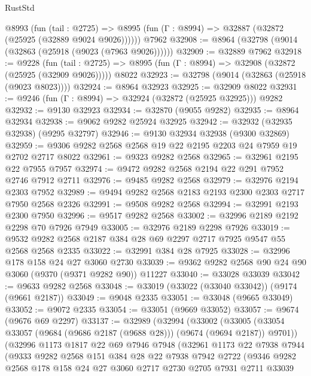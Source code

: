 \begin{lexlean}{RustStd}
\begin{coremodule}
    @8993
      (fun (tail : @2725) =>
      @8995 (fun (Γ : @8994) => @32887 (@32872 (@25925 (@32889 @9024 @9026))))))
    @7962
@32908 := @8964 (@32798 (@9014 (@32863 (@25918 (@9023 (@7963 @9026))))))
@32909 := @32889 @7962
@32918 := @9228
    (fun (tail : @2725) => @8995 (fun (Γ : @8994) => @32908 (@32872 (@25925 (@32909 @9026)))))
    @8022
@32923 := @32798 (@9014 (@32863 (@25918 (@9023 @8023))))
@32924 := @8964 @32923
@32925 := @32909 @8022
@32931 := @9246 (fun (Γ : @8994) => @32924 (@32872 (@25925 @32925))) @9282
@32932 := @9130 @32923
@32934 := @32870 (@9055 @9282)
@32935 := @8964 @32934
@32938 := @9062 @9282 @25924 @32925
@32942 := @32932 (@32935 @32938) (@9295 @32797)
@32946 := @9130 @32934 @32938 (@9300 @32869)
@32959 := @9306 @9282 @2568 @2568 @19 @22 @2195 @2203 @24 @7959 @19 @2702 @2717 @8022
@32961 := @9323 @9282 @2568
@32965 := @32961 @2195 @22 @7955 @7957
@32974 := @9472 @9282 @2568 @2194 @22 @291 @7952 @2746 @7912 @2711
@32976 := @9485 @9282 @2568
@32979 := @32976 @2194 @2303 @7952
@32989 := @9494 @9282 @2568 @2183 @2193 @2300 @2303 @2717 @7950 @2568 @2326
@32991 := @9508 @9282 @2568
@32994 := @32991 @2193 @2300 @7950
@32996 := @9517 @9282 @2568
@33002 := @32996 @2189 @2192 @2298 @70 @7926 @7949
@33005 := @32976 @2189 @2298 @7926
@33019 := @9532 @9282 @2568 @2187 @384 @28 @69 @2297 @2717 @7925 @9547 @55 @2568 @2568 @2335
@33022 := @32991 @384 @28 @7925
@33028 := @32996 @178 @158 @24 @27 @3060 @2730
@33039 := @9362 @9282 @2568 @90 @24 @90 @3060 (@9370 (@9371 @9282 @90)) @11227
@33040 := @33028 @33039
@33042 := @9633 @9282 @2568
@33048 := @33019 (@33022 (@33040 @33042)) (@9174 (@9661 @2187))
@33049 := @9048 @2335
@33051 := @33048 (@9665 @33049)
@33052 := @9072 @2335
@33054 := @33051 (@9669 @33052)
@33057 := @9674 (@9676 @69 @2297)
@33137 := @32989
    (@32994
      (@33002
        (@33005 (@33054 @33057 (@9684 (@9686 @2187 (@9688 @28))) (@9674 (@9694 @2187)) @9701))
        (@32996
          @1173
          @1817
          @22
          @69
          @7946
          @7948
          (@32961
            @1173
            @22
            @7938
            @7944
            (@9333
              @9282
              @2568
              @151
              @384
              @28
              @22
              @7938
              @7942
              @2722
              (@9346
                @9282
                @2568
                @178
                @158
                @24
                @27
                @3060
                @2717
                @2730
                @2705
                @7931
                @2711
                @33039

\end{coremodule}
\end{lexlean}
